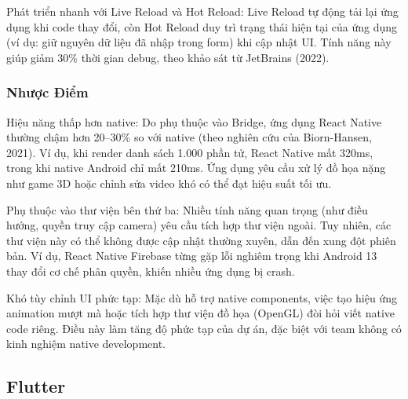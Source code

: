       \begin{flushleft}
        \hspace*{0.8cm}Phát triển nhanh với Live Reload và Hot Reload: Live Reload tự động tải lại ứng dụng khi code thay đổi, còn Hot Reload duy trì trạng thái hiện tại của ứng dụng (ví dụ: giữ nguyên dữ liệu đã nhập trong form) khi cập nhật UI. Tính năng này giúp giảm 30\% thời gian debug, theo khảo sát từ JetBrains (2022).
      \end{flushleft}

      \subsubsection{Nhược Điểm}
      \begin{flushleft}
        \hspace*{0.8cm}Hiệu năng thấp hơn native: Do phụ thuộc vào Bridge, ứng dụng React Native thường chậm hơn 20–30\% so với native (theo nghiên cứu của Biorn-Hansen, 2021). Ví dụ, khi render danh sách 1.000 phần tử, React Native mất 320ms, trong khi native Android chỉ mất 210ms. Ứng dụng yêu cầu xử lý đồ họa nặng như game 3D hoặc chỉnh sửa video khó có thể đạt hiệu suất tối ưu.
      \end{flushleft}

      \begin{flushleft}
        \hspace*{0.8cm}Phụ thuộc vào thư viện bên thứ ba: Nhiều tính năng quan trọng (như điều hướng, quyền truy cập camera) yêu cầu tích hợp thư viện ngoài. Tuy nhiên, các thư viện này có thể không được cập nhật thường xuyên, dẫn đến xung đột phiên bản. Ví dụ, React Native Firebase từng gặp lỗi nghiêm trọng khi Android 13 thay đổi cơ chế phân quyền, khiến nhiều ứng dụng bị crash.
      \end{flushleft}

      \begin{flushleft}
        \hspace*{0.8cm}Khó tùy chỉnh UI phức tạp: Mặc dù hỗ trợ native components, việc tạo hiệu ứng animation mượt mà hoặc tích hợp thư viện đồ họa (OpenGL) đòi hỏi viết native code riêng. Điều này làm tăng độ phức tạp của dự án, đặc biệt với team không có kinh nghiệm native development.
      \end{flushleft}

% 
\subsection{Flutter}
\renewcommand{\labelitemi}{--}    

